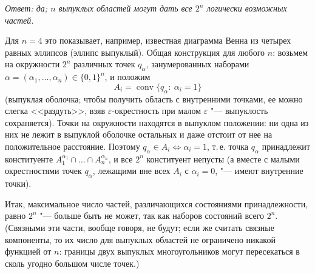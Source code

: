 \begin{solution}[2 (\S\,2)]
\emph{Ответ: да; $n$ выпуклых областей могут дать все $2^n$
логически возможных частей.}

Для $n=4$ это показывает, например, известная диаграмма Венна из четырех
равных эллипсов (эллипс выпуклый). Общая конструкция для любого $n$:
возьмем на окружности $2^n$ различных точек $q_\alpha$, занумерованных
наборами $\alpha=(\alpha_1,\dots,\alpha_n)\in\{0,1\}^n$, и положим
\[
A_i=\operatorname{conv}\{q_\alpha:\ \alpha_i=1\}
\]
(выпуклая оболочка; чтобы получить область с внутренними точками, ее можно
слегка <<раздуть>>, взяв $\varepsilon$-окрестность при малом
$\varepsilon$ "--- выпуклость сохраняется). Точки на окружности находятся
в выпуклом положении: ни одна из них не лежит в выпуклой оболочке
остальных и даже отстоит от нее на положительное расстояние. Поэтому
$q_\alpha\in A_i\iff\alpha_i=1$, т.\,е. точка $q_\alpha$ принадлежит
конституенте $A_1^{\alpha_1}\cap\dots\cap A_n^{\alpha_n}$, и все $2^n$
конституент непусты (а вместе с малыми окрестностями точек $q_\alpha$,
лежащими вне всех $A_i$ с $\alpha_i=0$, "--- имеют внутренние точки).

Итак, максимальное число частей, различающихся состояниями
принадлежности, равно $2^n$ "--- больше быть не может, так как наборов
состояний всего $2^n$. (Связными эти части, вообще говоря, не будут; если
же считать связные компоненты, то их число для выпуклых областей не
ограничено никакой функцией от $n$: границы двух выпуклых многоугольников
могут пересекаться в сколь угодно большом числе точек.)
\end{solution}

